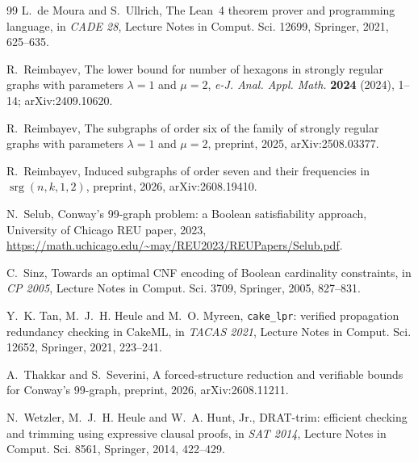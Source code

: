 \documentclass[11pt]{amsart}
\theoremstyle{remark}
\newcommand{\srg}{\operatorname{srg}}
\begin{document}
\begin{thebibliography}{99}
L.~de Moura and S.~Ullrich, The Lean~4 theorem prover and programming
language, in \emph{CADE 28}, Lecture Notes in Comput. Sci. 12699, Springer,
2021, 625--635.

R.~Reimbayev, The lower bound for number of hexagons in strongly regular
graphs with parameters $\lambda=1$ and $\mu=2$, \emph{e-J. Anal. Appl. Math.}
\textbf{2024} (2024), 1--14; arXiv:2409.10620.

R.~Reimbayev, The subgraphs of order six of the family of strongly regular
graphs with parameters $\lambda=1$ and $\mu=2$, preprint, 2025,
arXiv:2508.03377.

R.~Reimbayev, Induced subgraphs of order seven and their frequencies in
$\srg(n,k,1,2)$, preprint, 2026, arXiv:2608.19410.

N.~Selub, Conway's 99-graph problem: a Boolean satisfiability approach,
University of Chicago REU paper, 2023,
\url{https://math.uchicago.edu/~may/REU2023/REUPapers/Selub.pdf}.

C.~Sinz, Towards an optimal CNF encoding of Boolean cardinality constraints,
in \emph{CP 2005}, Lecture Notes in Comput. Sci. 3709, Springer, 2005,
827--831.

Y.~K. Tan, M.~J.~H. Heule and M.~O. Myreen, \texttt{cake\_lpr}: verified
propagation redundancy checking in CakeML, in \emph{TACAS 2021}, Lecture Notes
in Comput. Sci. 12652, Springer, 2021, 223--241.

A.~Thakkar and S.~Severini, A forced-structure reduction and verifiable bounds
for Conway's 99-graph, preprint, 2026, arXiv:2608.11211.

N.~Wetzler, M.~J.~H. Heule and W.~A. Hunt, Jr., DRAT-trim: efficient checking
and trimming using expressive clausal proofs, in \emph{SAT 2014}, Lecture
Notes in Comput. Sci. 8561, Springer, 2014, 422--429.

\end{thebibliography}
\end{document}
